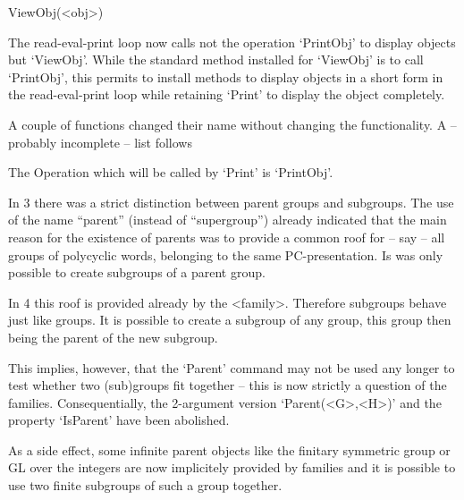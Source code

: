 \>ViewObj(<obj>)

The read-eval-print loop now calls not the operation `PrintObj' to display 
objects but `ViewObj'. While the standard method installed for `ViewObj' is to
call `PrintObj', this permits to  install methods to display objects in a
short form in the read-eval-print loop while retaining `Print' to display
the object completely.


A couple of functions changed their name without changing the
functionality. A -- probably incomplete -- list follows

The Operation which will be called by `Print' is `PrintObj'.


In {\GAP}3 there was a strict distinction between parent groups and
subgroups.
The use of the name ``parent''
(instead of ``supergroup'') already indicated that the main reason for the
existence of parents was to provide
a common roof for -- say -- all groups of polycyclic words, belonging to the
same PC-presentation. Is was only possible to create subgroups of
a parent group.

In {\GAP}4 this roof is provided already by the <family>. Therefore
subgroups behave just like groups. It is possible to create a subgroup of
any group, this group then being the parent of the new subgroup.

This implies, however, that the `Parent' command may not be used any longer
to test whether two (sub)groups fit together -- this is now strictly a
question of the families. Consequentially, the 2-argument version
`Parent(<G>,<H>)' and the property `IsParent' have been abolished.

As a side effect, some infinite parent objects like the finitary symmetric
group or GL over the integers are now implicitely provided by families and
it is possible to use two finite subgroups of such a group together.

